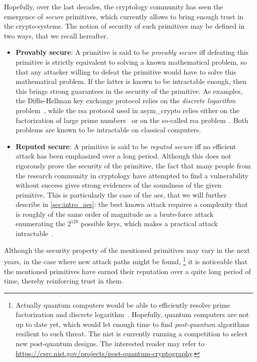 Hopefully, over the last decades, the \gls{cryptology} community has seen the emergence of \emph{secure} primitives, which currently allows to bring enough trust in the crypto-systems.
The notion of security of such primitives may be defined in two ways, that we recall hereafter.
\begin{itemize}
	\item \textbf{Provably secure}: A primitive is said to be \emph{provably secure} \gls{iff} defeating this primitive is strictly equivalent to solving a known mathematical problem, so that any attacker willing to defeat the primitive would have to solve this mathematical problem.
	If the latter is known to be intractable enough, then this brings strong guarantees in the security of the primitive.
	As examples, the Diffie-Hellman key exchange protocol relies on the \emph{discrete logarithm} problem~\cite{diffie_new_1976}, while the \gls{rsa} protocol used in \gls{asym_crypto} relies either on the factorization of large prime numbers~\cite{rsa_1978} or on the so-called \gls{rsa} problem~\cite{boneh_breaking_1998}.
	Both problems are known to be intractable on classical computers.
	\item \textbf{Reputed secure}: A primitive is said to be \emph{reputed secure} \gls{iff} no efficient attack has been emphasized over a long period.
	Although this does not rigorously prove the security of the primitive, the fact that many people from the research community in \gls{cryptology} have attempted to find a vulnerability without success gives strong evidences of the soundness of the given primitive.
	This is particularly the case of the \gls{aes}, that we will further describe in \autoref{sec:intro_aes}: the best known attack requires a complexity that is roughly of the same order of magnitude as a brute-force attack enumerating the \(2^{128}\) possible keys, which makes a practical attack intractable~\cite{bogdanov_biclique_2011}.
\end{itemize}

Although the security property of the mentioned primitives may vary in the next years, in the case where new attack paths might be found,%
\footnote{Actually quantum computers would be able to efficiently resolve prime factorization and discrete logarithm~\cite{shor_poly_1994}.
Hopefully, quantum computers are not up to date yet, which would let enough time to find \emph{post-quantum} algorithms resilient to such threat.
The \gls{nist} is currently running a competition to select new post-quantum designs.
The interested reader may refer to \url{https://csrc.nist.gov/projects/post-quantum-cryptography}.}
it is noticeable that the mentioned primitives have earned their reputation over a quite long period of time, thereby reinforcing trust in them.

